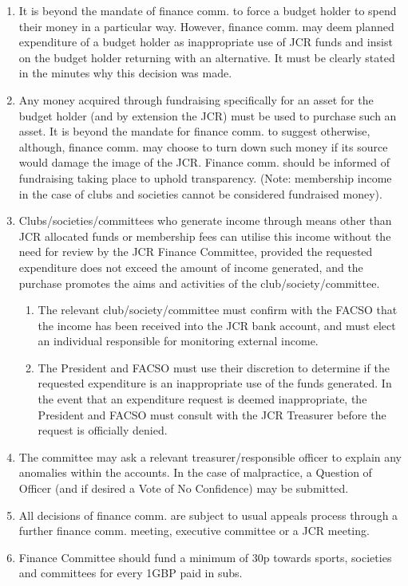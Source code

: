 \begin{enumerate}
    \item It is beyond the mandate of finance comm. to force a budget holder to spend their money in a particular way. However, finance comm. may deem planned expenditure of a budget holder as inappropriate use of JCR funds and insist on the budget holder returning with an alternative. It must be clearly stated in the minutes why this decision was made.
    \item Any money acquired through fundraising specifically for an asset for the budget holder (and by extension the JCR) must be used to purchase such an asset. It is beyond the mandate for finance comm. to suggest otherwise, although, finance comm. may choose to turn down such money if its source would damage the image of the JCR. Finance comm. should be informed of fundraising taking place to uphold transparency. (Note: membership income in the case of clubs and societies cannot be considered fundraised money).
    \label{it:Fundraising}
    \item Clubs/societies/committees who generate income through means other than JCR allocated funds or membership fees can utilise this income without the need for review by the JCR Finance Committee, provided the requested expenditure does not exceed the amount of income generated, and the purchase promotes the aims and activities of the club/society/committee. 
    \begin{enumerate}
        \item The relevant club/society/committee must confirm with the FACSO that the income has been received into the JCR bank account, and must elect an individual responsible for monitoring external income. 
        \item The President and FACSO must use their discretion to determine if the requested expenditure is an inappropriate use of the funds generated. In the event that an expenditure request is deemed inappropriate, the President and FACSO must consult with the JCR Treasurer before the request is officially denied.
    \end{enumerate}
    \item The committee may ask a relevant treasurer/responsible officer to explain any anomalies within the accounts. In the case of malpractice, a Question of Officer (and if desired a Vote of No Confidence) may be submitted.
    \item All decisions of finance comm. are subject to usual appeals process through a further finance comm. meeting, executive committee or a JCR meeting.
    \item Finance Committee should fund a minimum of 30p towards sports, societies and committees for every 1GBP paid in subs.

\end{enumerate}
